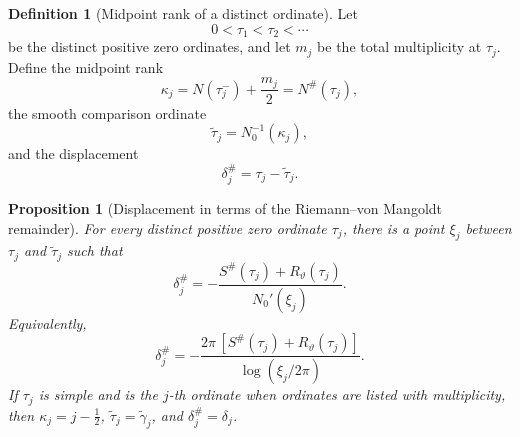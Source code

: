 \documentclass[11pt]{amsart}
\numberwithin{equation}{section}
\theoremstyle{plain}
\newtheorem{proposition}[theorem]{Proposition}
\theoremstyle{definition}
\newtheorem{definition}[theorem]{Definition}
\theoremstyle{remark}
\newcommand{\1}{\mathbf{1}}
\begin{document}
\begin{definition}[Midpoint rank of a distinct ordinate]
\label{def:midpoint_rank_distinct_ordinate}
Let
\[
0<\tau_1<\tau_2<\cdots
\]
be the distinct positive zero ordinates, and let \(m_j\) be the total
multiplicity at \(\tau_j\).  Define the midpoint rank
\begin{equation}
\kappa_j
=
N(\tau_j^-)+\frac{m_j}{2}
=
N^{\#}(\tau_j),
\label{eq:midpoint_rank_distinct_ordinate}
\end{equation}
the smooth comparison ordinate
\begin{equation}
\widetilde\tau_j
=
N_0^{-1}(\kappa_j),
\label{eq:smooth_distinct_ordinate}
\end{equation}
and the displacement
\begin{equation}
\delta_j^{\#}
=
\tau_j-\widetilde\tau_j.
\label{eq:distinct_ordinate_displacement}
\end{equation}
\end{definition}

\begin{proposition}[Displacement in terms of the Riemann--von Mangoldt remainder]
\label{prop:displacement_rvm_remainder}
For every distinct positive zero ordinate \(\tau_j\), there is a point
\(\xi_j\) between \(\tau_j\) and \(\widetilde\tau_j\) such that
\begin{equation}
\boxed{
\delta_j^{\#}
=
-
\frac{S^{\#}(\tau_j)+R_\vartheta(\tau_j)}
{N_0'(\xi_j)}.
}
\label{eq:displacement_rvm_formula}
\end{equation}
Equivalently,
\begin{equation}
\delta_j^{\#}
=
-
\frac{2\pi\,[S^{\#}(\tau_j)+R_\vartheta(\tau_j)]}
{\log(\xi_j/2\pi)}.
\label{eq:displacement_rvm_explicit}
\end{equation}
If \(\tau_j\) is simple and is the \(j\)-th ordinate when ordinates are
listed with multiplicity, then
\(\kappa_j=j-\tfrac12\),
\(\widetilde\tau_j=\widetilde\gamma_j\), and
\(\delta_j^{\#}=\delta_j\).
\end{proposition}
\end{document}
